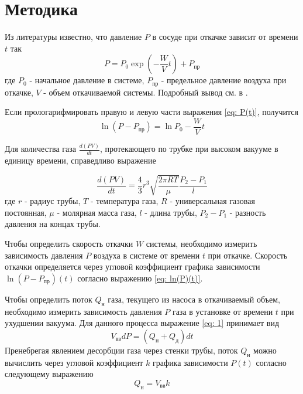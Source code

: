 \section{Методика}

Из литературы \cite{Sivuhin} известно, что давление $P$ в сосуде при откачке зависит от времени $t$ так
\begin{equation}
    P = P_0\exp({-\frac{W}{V}t}) + P_\text{пр} \label{eq: P(t)}
\end{equation}
где $P_0$ - начальное давление в системе, $P_\text{пр}$ - предельное давление воздуха при откачке, $V$ - объем откачиваемой системы. Подробный вывод см. в .

Если прологарифмировать правую и левую части выражения \eqref{eq: P(t)}, получится
\begin{equation}
    \ln({P - P_\text{пр}}) = \ln{P_0} -\frac{W}{V}t \label{eq: ln(P)(t)}
\end{equation}

Для количества газа $\frac{d(PV)}{dt}$, протекающего по трубке при высоком вакууме в единицу времени, справедливо выражение

\begin{equation}
    \frac{d(PV)}{dt} = \frac{4}{3}r^3\sqrt{\frac{2\pi RT}{\mu}}\frac{P_2-P_1}{l} \label{eq: C}
\end{equation}
где $r$ - радиус трубы, $T$ - температура газа, $R$ - универсальная газовая постоянная, $\mu$ - молярная масса газа, $l$ - длина трубы, $P_2-P_1$ - разность давления на концах трубы.

Чтобы определить скорость откачки $W$ системы, необходимо измерить зависимость давления $P$ воздуха в системе от времени $t$ при откачке. Скорость откачки определяется через угловой коэффициент графика зависимости $\ln({P - P_\text{пр}})(t)$ согласно выражению \eqref{eq: ln(P)(t)}.

Чтобы определить поток $Q_\text{н}$ газа, текущего из насоса в откачиваемый объем, необходимо измерить зависимость давления $P$ газа в установке от времени $t$ при ухудшении вакуума. Для данного процесса выражение \eqref{eq: 1} принимает вид 
\begin{equation}
    V_\text{вв}dP = (Q_\text{н} + Q_\text{д})dt \label{eq: dP_dt}
\end{equation}
Пренебрегая явлением десорбции газа через стенки трубы, поток $Q_\text{н}$ можно вычислить через угловой коэффициент $k$ графика зависимости $P(t)$ согласно следующему выражению
\begin{equation}
    Q_\text{н} = V_\text{вв}k \label{eq: Q_n}
\end{equation}

